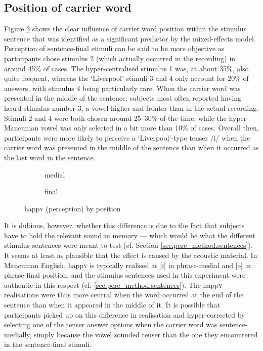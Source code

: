 \subsection{Position of carrier word}
\label{sec.perc_res.happy.position}

Figure \ref{fig.bar.happy.tot.ext.pos} shows the clear influence of carrier word position within the stimulus sentence that was identified as a significant predictor by the mixed-effects model.
Perception of sentence-final stimuli can be said to be more objective as participants chose stimulus 2 (which actually occurred in the recording) in around 45\% of cases.
The hyper-centralised stimulus 1 was, at about 35\%, also quite frequent, whereas the `Liverpool' stimuli 3 and 4 only account for 20\% of answers, with stimulus 4 being particularly rare.
When the carrier word was presented in the middle of the sentence, subjects most often reported having heard stimulus number 3, a vowel higher and fronter than in the actual recording.
Stimuli 2 and 4 were both chosen around 25--30\% of the time, while the hyper-Mancunian vowel was only selected in a bit more than 10\% of cases.
Overall then, participants were more likely to perceive a `Liverpool'-type tenser /i/ when the carrier word was presented in the middle of the sentence than when it occurred as the last word in the sentence.

\begin{figure}[h]
	\centering
	\begin{subfigure}{0.49\textwidth}
		\centering
			\resizebox{\linewidth}{!}{} 
		\caption{medial}
		\label{fig.bar.happy.tot.ext.med}
	\end{subfigure}
	\begin{subfigure}{0.49\textwidth}
		\centering
			\resizebox{\linewidth}{!}{} 
		\caption{final}
		\label{fig.bar.happy.tot.ext.fin}
	\end{subfigure}
	\caption{happ\textsc{y} (perception) by position}
	\label{fig.bar.happy.tot.ext.pos}
\end{figure}

It is dubious, however, whether this difference is due to the fact that subjects have to hold the relevant sound in memory --- which would be what the different stimulus sentences were meant to test (cf. Section \ref{sec.perc_method.sentences}).
It seems at least as plausible that the effect is caused by the acoustic material.
In Mancunian English, happ\textsc{y} is typically realised as [ɪ] in phrase-medial and [ə] in phrase-final position, and the stimulus sentences used in this experiment were authentic in this respect (cf. \ref{sec.perc_method.sentences}).
The happ\textsc{y} realisations were thus more central when the word occurred at the end of the sentence than when it appeared in the middle of it.
It is possible that participants picked up on this difference in realisation and hyper-corrected by selecting one of the tenser answer options when the carrier word was sentence-medially, simply because the vowel sounded tenser than the one they encountered in the sentence-final stimuli.

